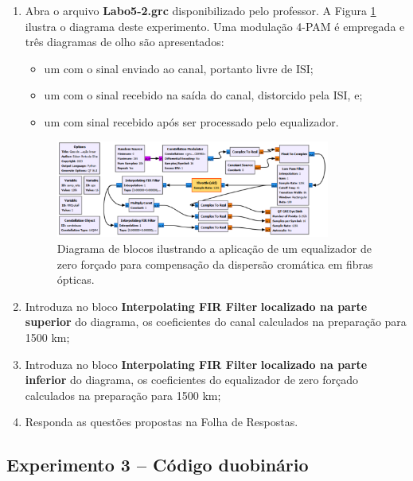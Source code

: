 \documentclass[12pt,addpoints]{exam}
\begin{document}
\begin{enumerate}
    \item Abra o arquivo \textbf{Labo5-2.grc} disponibilizado pelo professor. A Figura \ref{fig:GRC_5-2} ilustra o diagrama deste experimento. Uma modulação 4-PAM é empregada e três diagramas de olho são apresentados: 
    \begin{itemize}
        \item um com o sinal enviado ao canal, portanto livre de ISI;
        \item um com o sinal recebido na saída do canal, distorcido pela ISI, e;
        \item um com sinal recebido após ser processado pelo equalizador.
    \end{itemize}
    \begin{figure}[htb]
        \centering
        \includegraphics[width=0.85\textwidth]{Figuras/Labo5-2}
        \caption{Diagrama de blocos ilustrando a aplicação de um equalizador de zero forçado para compensação da dispersão cromática em fibras ópticas.}
        \label{fig:GRC_5-2}
    \end{figure}
    \item Introduza no bloco \textbf{Interpolating FIR Filter} \textbf{localizado na parte superior} do diagrama, os coeficientes do canal calculados na preparação para 1500 km;
    \item Introduza no bloco \textbf{Interpolating FIR Filter} \textbf{localizado na parte inferior} do diagrama, os coeficientes do equalizador de zero forçado calculados na preparação para 1500 km;
    \item Responda as questões propostas na Folha de Respostas.
\end{enumerate}

\subsection{Experimento 3 -- Código duobinário}
\end{document}
